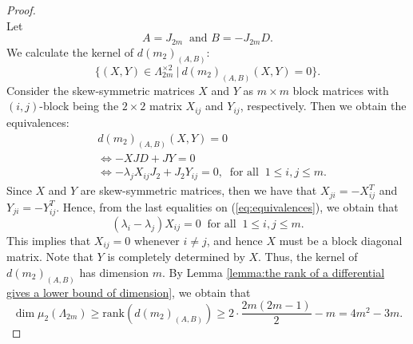\documentclass[reqno]{amsart}
\theoremstyle{definition}
\newcommand{\rank}{\mathrm{rank}}
\numberwithin{equation}{section}
\begin{document}
\begin{proof}
\begin{equation}
        \end{equation}
        Let
        \begin{equation*}
            A=J_{2m}~\text{ and } B=-J_{2m}D.
        \end{equation*}
        We calculate the kernel of $d(m_2)_{(A,B)}$:
        \begin{equation*}
            \{(X,Y) \in \Lambda_{2m}^{\times 2}~|~d(m_2)_{(A,B)}(X,Y)=0\}.
        \end{equation*}
        Consider the skew-symmetric matrices $X$ and $Y$ as $m \times m$ block matrices with $(i,j)$-block being the $2 \times 2$ matrix $X_{ij}$ and $Y_{ij}$, respectively. Then we obtain the equivalences:
        \begin{equation}\label{eq:equivalences}
        \begin{aligned}
            &d(m_2)_{(A,B)}(X,Y)=0\\
            &\Leftrightarrow -XJD+JY=0\\
            &\Leftrightarrow -\lambda_j X_{ij}J_2 + J_2Y_{ij}=0,~\text{ for all }~1 \leq i,j \leq m.
        \end{aligned}
        \end{equation}
        Since $X$ and $Y$ are skew-symmetric matrices, then we have that $X_{ji}=-X_{ij}^T$ and $Y_{ji}=-Y_{ij}^T$. Hence, from the last equalities on (\ref{eq:equivalences}), we obtain that
        \begin{equation*}
            (\lambda_i-\lambda_j)X_{ij}=0~\text{ for all }~1 \leq i,j \leq m.
        \end{equation*}
        This implies that $X_{ij}=0$ whenever $i \neq j$, and hence $X$ must be a block diagonal matrix. Note that $Y$ is completely determined by $X$. Thus, the kernel of $d(m_2)_{(A,B)}$ has dimension $m$. By Lemma \ref{lemma:the rank of a differential gives a lower bound of dimension}, we obtain that
        \begin{equation*}
            \dim \mu_2(\Lambda_{2m}) \geq \rank(d(m_2)_{(A,B)}) \geq 2 \cdot \frac{2m(2m-1)}{2}-m=4m^2-3m.
        \end{equation*}


\end{proof}
\end{document}
